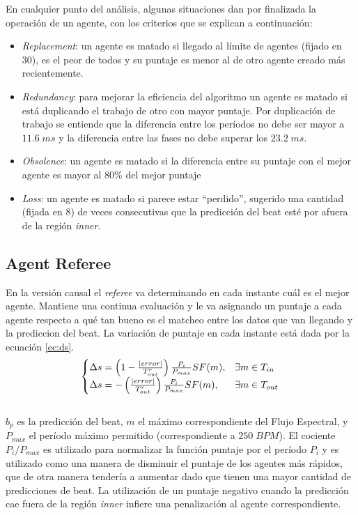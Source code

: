 \documentclass[12pt,a4paper,titlepage]{report}
\begin{document}
En cualquier punto del análisis, algunas situaciones dan por finalizada la operación de un agente, con los criterios que se explican a continuación:

\begin{itemize}
\item \emph{Replacement}: un agente es matado si llegado al límite de agentes (fijado en 30), es el peor de todos y su puntaje es menor al de otro agente creado más recientemente.
\item \emph{Redundancy}: para mejorar la eficiencia del algoritmo un agente es matado si está duplicando el trabajo de otro con mayor puntaje. Por duplicación de trabajo se entiende que la diferencia entre los períodos no debe ser mayor a $11.6\;ms$ y la diferencia entre las fases no debe superar los $23.2\;ms$.
\item \emph{Obsolence}: un agente es matado si la diferencia entre su puntaje con el mejor agente es mayor al 80\% del mejor puntaje
\item \emph{Loss}: un agente es matado si parece estar ``perdido'', sugerido una cantidad (fijada en 8) de veces consecutivas que la predicción del beat esté por afuera de la región \emph{inner}.
\end{itemize}

\subsection{Agent Referee}

En la versión causal el \emph{referee} va determinando en cada instante cuál es el mejor agente. Mantiene una continua evaluación y le va asignando un puntaje a cada agente respecto a qué tan bueno es el matcheo entre los datos que van llegando y la prediccion del beat. La variación de puntaje en cada instante está dada por la ecuación \ref{ec:ds}.\\

\begin{equation}
\begin{cases}
\Delta s = \left(1-\frac{|error|}{T^r_{out}} \right)\frac{P_i}{P_{max}}SF(m), & \exists m \in T_{in}\\
\Delta s = -\left(\frac{|error|}{T^r_{out}} \right)\frac{P_i}{P_{max}}SF(m), & \exists m \in T_{out}
\end{cases}
\label{ec:ds}\\
\end{equation}
\\
$b_p$ es la predicción del beat, $m$ el máximo correspondiente del Flujo Espectral, y $P_{max}$ el período máximo permitido (correspondiente a $250\;BPM$). El cociente $P_i/P_{max}$ es utilizado para normalizar la función puntaje por el período $P_i$ y es utilizado como una manera de disminuir el puntaje de los agentes más rápidos, que de otra manera tendería a aumentar dado que tienen una mayor cantidad de predicciones de beat. La utilización de un puntaje negativo cuando la predicción cae fuera de la región \emph{inner} infiere una penalización al agente correspondiente.\\
\end{document}
